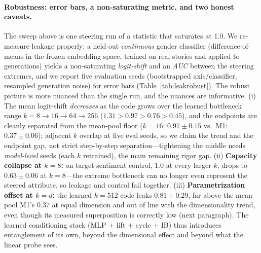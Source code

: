 \documentclass[11pt]{article}
\begin{document}
\paragraph{Robustness: error bars, a non-saturating metric, and two honest caveats.}
The sweep above is one steering run of a statistic that saturates at $1.0$. We
re-measure leakage properly: a held-out \emph{continuous} gender classifier
(difference-of-means in the frozen embedding space, trained on real stories and
applied to generations) yields a non-saturating \emph{logit-shift} and an
\emph{AUC} between the steering extremes, and we report five evaluation seeds
(bootstrapped axis/classifier, resampled generation noise) for error bars
(Table~\ref{tab:leakrobust}). The robust picture is more nuanced than the single
run, and the nuances are informative. (i) The mean logit-shift \emph{decreases} as
the code grows over the learned bottleneck range
$k{=}8\!\to\!16\!\to\!64\!\to\!256$ ($1.31\!>\!0.97\!>\!0.76\!>\!0.45$), and the
endpoints are cleanly separated from the mean-pool floor ($k{=}16$:
$0.97\!\pm\!0.15$ vs.\ M1: $0.37\!\pm\!0.06$); adjacent $k$ overlap at five eval
seeds, so we claim the trend and the endpoint gap, not strict step-by-step
separation---tightening the middle needs \emph{model-level} seeds (each $k$
retrained), the main remaining rigor gap. (ii) \textbf{Capacity collapse at
$k{=}8$:} on-target sentiment control, $1.0$ at every larger $k$, drops to
$0.63\!\pm\!0.06$ at $k{=}8$---the extreme bottleneck can no longer even represent
the steered attribute, so leakage and control fail together. (iii)
\textbf{Parametrization offset at $k{=}d$:} the learned $k{=}512$ code leaks
$0.81\!\pm\!0.29$, far above the mean-pool M1's $0.37$ at equal dimension and out
of line with the dimensionality trend, even though its measured superposition is
correctly low (next paragraph). The learned conditioning stack (MLP $+$ lift $+$
cycle $+$ IB) thus introduces entanglement of its own, beyond the dimensional
effect and beyond what the linear probe sees.
\end{document}
